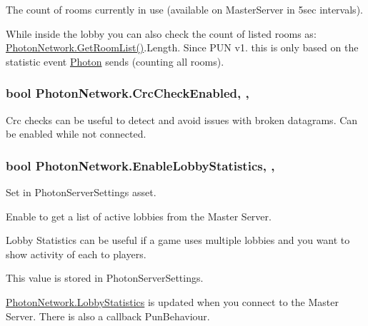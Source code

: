The count of rooms currently in use (available on Master\+Server in 5sec intervals). 

While inside the lobby you can also check the count of listed rooms as\+: \hyperlink{class_photon_network_aeef2085375accb7d4bc88e60cbe15eb9}{Photon\+Network.\+Get\+Room\+List()}.Length. Since P\+UN v1. this is only based on the statistic event \hyperlink{namespace_photon}{Photon} sends (counting all rooms). 
\subsubsection[{\texorpdfstring{Crc\+Check\+Enabled}{CrcCheckEnabled}}]{\setlength{\rightskip}{0pt plus 5cm}bool Photon\+Network.\+Crc\+Check\+Enabled\hspace{0.3cm}{\ttfamily [static]}, {\ttfamily [get]}, {\ttfamily [set]}}\hypertarget{class_photon_network_ae995c021d1295f00afd9f87cd3bd118c}{}\label{class_photon_network_ae995c021d1295f00afd9f87cd3bd118c}


Crc checks can be useful to detect and avoid issues with broken datagrams. Can be enabled while not connected.

\subsubsection[{\texorpdfstring{Enable\+Lobby\+Statistics}{EnableLobbyStatistics}}]{\setlength{\rightskip}{0pt plus 5cm}bool Photon\+Network.\+Enable\+Lobby\+Statistics\hspace{0.3cm}{\ttfamily [static]}, {\ttfamily [get]}, {\ttfamily [set]}}\hypertarget{class_photon_network_a8ce4ab4a44e705199ff795b2eb9b395b}{}\label{class_photon_network_a8ce4ab4a44e705199ff795b2eb9b395b}


Set in Photon\+Server\+Settings asset. 

Enable to get a list of active lobbies from the Master Server. 

Lobby Statistics can be useful if a game uses multiple lobbies and you want to show activity of each to players.

This value is stored in Photon\+Server\+Settings.

\hyperlink{class_photon_network_abdced09cccf61ae817cb97705ffce137}{Photon\+Network.\+Lobby\+Statistics} is updated when you connect to the Master Server. There is also a callback Pun\+Behaviour. 
